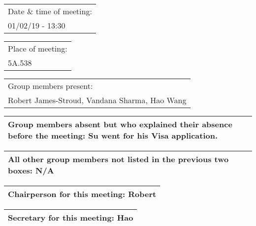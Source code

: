 \documentclass{article}
\begin{document}
\begin{table}[H]
	\centering
	\begin{tabular}{| p{12cm}  |}
	\hline
	Date \& time of meeting: \\ 
	01/02/19 - 13:30 \\ \hline
\end{tabular}
\end{table}

\begin{table}[H]
	\centering
	\begin{tabular}{| p{12cm}  |}
	\hline
	Place of meeting: \\ 
	5A.538 \\ \hline
\end{tabular}
\end{table}

\begin{table}[H]
	\centering
	\begin{tabular}{| p{12cm}  |}
	\hline
	Group members present: \\ 
	Robert James-Stroud, Vandana Sharma, Hao Wang\\ \hline
\end{tabular}
\end{table}

\begin{table}[H]
	\centering
	\begin{tabular}{| p{12cm}  |}
	\hline
	Group members absent but who explained their absence before the meeting: Su went for his Visa application. \\ \hline
\end{tabular}
\end{table}

\begin{table}[H]
	\centering
	\begin{tabular}{| p{12cm}  |}
	\hline
	All other group members not listed in the previous two boxes: N/A\\ \hline
\end{tabular}
\end{table}

\begin{table}[H]
	\centering
	\begin{tabular}{| p{12cm}  |}
	\hline
	Chairperson for this meeting: Robert \\ \hline
\end{tabular}
\end{table}

\begin{table}[H]
	\centering
	\begin{tabular}{| p{12cm}  |}
	\hline
	Secretary for this meeting: Hao \\ \hline
\end{tabular}
\end{table}
\end{document}
